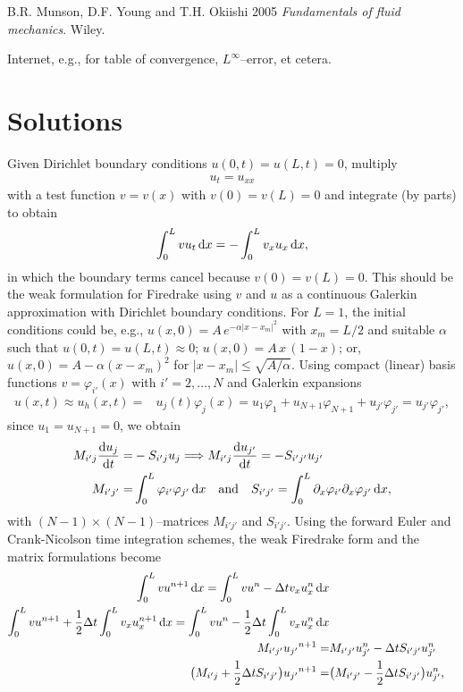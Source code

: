 \documentclass [12pt,english]{article}
\def\frac#1#2{ {#1\over#2}}
\begin{document}
\noindent
B.R. Munson, D.F. Young and T.H. Okiishi 2005
{\em Fundamentals of fluid mechanics}. Wiley. 

\noindent
Internet, e.g., for table of convergence, $L^{\infty}$--error, et cetera.


\newpage

\appendix

\section{Solutions}

Given Dirichlet boundary conditions $u(0,t)=u(L,t)=0$, multiply
\begin{align}
u_t=u_{xx}
\end{align}
with a test function $v=v(x)$ with $v(0)=v(L)=0$ and integrate (by parts) to obtain
\begin{align}
 \int_0^L v u_t\,{\rm d} x = -\int_0^{L} v_x u_{x}\,{\rm d} x,
\end{align}
in which the boundary terms cancel because $v(0)=v(L)=0$.
This should be the weak formulation for Firedrake using $v$ and $u$ as a continuous Galerkin approximation
with Dirichlet boundary conditions.
For $L=1$, the initial conditions could be, e.g.,
$u(x,0)= A\,e^{-\alpha|x-x_m|^2}$ with $x_m=L/2$ and suitable $\alpha$ such that $u(0,t)=u(L,t)\approx 0$;
$u(x,0)=A\,x\,(1-x)$; or, $u(x,0)= A-\alpha(x-x_m)^2$ for $|x-x_m| \le \sqrt{A/\alpha}$.
Using compact (linear) basis functions $v=\varphi_{i'}(x)$ with $i'=2,\dots,N$ and Galerkin expansions
\begin{align}
u(x,t)\approx u_h(x,t) =&  u_j(t)\varphi_j(x) = u_1\varphi_1+u_{N+1}\varphi_{N+1}+u_{j'}\varphi_{j'}
= u_{j'}\varphi_{j'}, 
\end{align}
since $u_1=u_{N+1}=0$, we obtain
\begin{align}
 M_{i' j } \frac {{\rm d}u_{j}}{{\rm d}t} =& -S_{i' j} u_j
 \Longrightarrow M_{i' j } \frac {{\rm d}u_{j'}}{{\rm d}t} = -S_{i' j'} u_{j'}\\
 M_{i' j'} =& \int_0^L\varphi_{i'}\varphi_{j'} \,{\rm d} x\quad\textrm{and}\quad
 S_{i' j'} = \int_0^L\partial_x \varphi_{i'}\partial_x\varphi_{j'} \,{\rm d} x,
\end{align}
with $(N-1)\times(N-1)$--matrices $M_{i' j'}$ and $S_{i'j'}$.
Using the forward Euler and Crank-Nicolson time integration schemes,
the weak Firedrake form and the matrix formulations become
\begin{align}
  \int_0^L v u^{n+1}\,{\rm d} x = \int_0^{L} v u^n-\Delta t v_x u^n_{x}\,{\rm d} x\\
  \int_0^L v u^{n+1}+\frac 12 \Delta t \int_0^{L} v_x u^{n+1}_{x}\,{\rm d} x = \int_0^L v u^{n}-\frac 12 \Delta t \int_0^{L} v_x u^{n}_{x}\,{\rm d} x\\
  M_{i' j' }  {u_{j'}}^{n+1} =& M_{i' j'} u_{j'}^{n}-\Delta t S_{i' j'} u_{j'}^n\\
  \bigl( M_{i' j } +\frac 12 \Delta t S_{i' j'}\bigr) {u_{j'}}^{n+1}
    =& \bigl(M_{i' j'} -\frac 12 \Delta t S_{i' j'}\bigr)u_{j'}^n,
\end{align}
\end{document}
